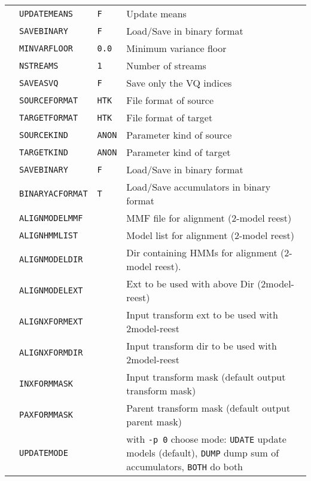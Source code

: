\newpage
{}

\begin{center}
\tabletail{\hline}
\begin{supertabular}{|p{1.8cm}|l|l|p{6.6cm}|}

  & \texttt{UPDATEMEANS} & \texttt{F} & Update means \\ 
 & \texttt{SAVEBINARY} & \texttt{F} & Load/Save in binary format \\ 
  & \texttt{MINVARFLOOR} & \texttt{0.0} & Minimum variance floor \\ \hline

  & \texttt{NSTREAMS} & \texttt{1} & Number of streams \\ 
  & \texttt{SAVEASVQ} & \texttt{F} & Save only the VQ indices \\ 
 & \texttt{SOURCEFORMAT} & \texttt{HTK} & File format of source \\ 
  & \texttt{TARGETFORMAT} & \texttt{HTK} & File format of target \\ 
  & \texttt{SOURCEKIND} & \texttt{ANON} & Parameter kind of source \\ 
  & \texttt{TARGETKIND} & \texttt{ANON} & Parameter kind of target \\ \hline

  & \texttt{SAVEBINARY} & \texttt{F} & Load/Save in binary format \\ 
  & \texttt{BINARYACFORMAT} & \texttt{T} & Load/Save accumulators in binary format \\ 
  & \texttt{ALIGNMODELMMF} & & MMF file for alignment (2-model reest)  \\ 
  & \texttt{ALIGNHMMLIST}  & & Model list for alignment (2-model reest) \\ 
  & \texttt{ALIGNMODELDIR} & & Dir containing HMMs for alignment (2-model reest).  \\ 
  & \texttt{ALIGNMODELEXT} & & Ext to be used with above Dir (2model-reest) \\  
  & \texttt{ALIGNXFORMEXT} & & Input transform ext to be used with 2model-reest \\  
  & \texttt{ALIGNXFORMDIR} & & Input transform dir to be used with 2model-reest \\  
  & \texttt{INXFORMMASK} & & Input transform mask (default output transform mask) \\  
  & \texttt{PAXFORMMASK} & & Parent transform mask (default output parent mask) \\  
  & \texttt{UPDATEMODE} & & with \texttt{-p 0} choose mode:
  \texttt{UDATE} update models (default), \texttt{DUMP} dump sum of
  accumulators, \texttt{BOTH} do both\\   
\hline


\end{supertabular}
\end{center}
